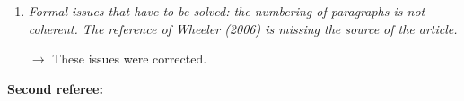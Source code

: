 \documentclass[11pt,a4paper,sans]{moderncv}        %
\begin{document}
\begin{enumerate}
   
  

	\medskip

   \item \textit{Formal issues that have to be solved: the numbering of paragraphs is not coherent. The reference of Wheeler (2006) is missing the source of the article.}
   
   $\rightarrow$ These issues were corrected.
 

\end{enumerate}


\bigskip
\bigskip

\textbf{Second referee:}
 


\medskip
\end{document}
